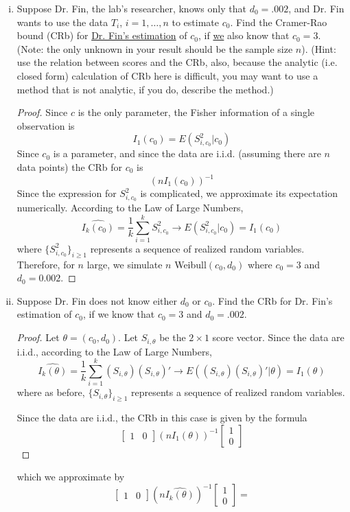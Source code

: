 \documentclass[letterpaper, 12pt]{article}
\begin{document}
\begin{enumerate}[(i)]
\item
Suppose Dr. Fin, the lab’s researcher, knows only that $d_0 = .002$, and Dr. Fin wants to use the data $T_i$,
$i = 1, \dots, n$ to estimate $c_0$. Find the Cramer-Rao bound (CRb) for \underline{Dr. Fin’s estimation} of $c_0$, if \underline{we} also
know that $c_0 = 3$. (Note: the only unknown in your result should be the sample size $n$). (Hint: use the
relation between scores and the CRb, also, because the analytic (i.e. closed form) calculation of CRb
here is difficult, you may want to use a method that is not analytic, if you do, describe the method.)

\begin{proof}
Since $c$ is the only parameter, the Fisher information of a single observation is
\[
I_1(c_0) = E(S_{i,c_0}^2 | c_0)
\]
Since $c_0$ is a parameter, and since the data are i.i.d. (assuming there are $n$ data points) the CRb for $c_0$ is
\[
(nI_1(c_0))^{-1}
\]
Since the expression for $S_{i,c_0}^2$ is complicated, we approximate its expectation numerically. According to the Law of Large Numbers, 
\[
\widehat{I_k(c_0)} = 
\frac{1}{k} \sum_{i=1}^k S_{i,c_0}^2 \to E(S_{i,c_0}^2 | c_0) = I_1(c_0)
\]
where $\{S_{i,c_0}^2\}_{i \geq 1}$ represents a sequence of realized random variables. Therefore, for $n$ large, we simulate $n$ Weibull$(c_0,d_0)$ where $c_0 = 3$ and $d_0 = 0.002$.
\end{proof}

\item
Suppose Dr. Fin does not know either $d_0$ or $c_0$. Find the CRb for Dr. Fin’s estimation of $c_0$, if we know
that $c_0 = 3$ and $d_0 = .002$.

\begin{proof}
Let $\theta = (c_0, d_0)$. Let $S_{i,\theta}$ be the $2 \times 1$ score vector. Since the data are i.i.d., according to the Law of Large Numbers,
\[
\widehat{I_k(\theta)} = \frac{1}{k}\sum_{i=1}^k (S_{i,\theta}) (S_{i, \theta})' \to E((S_{i,\theta}) (S_{i,\theta})'|\theta) = I_1(\theta)
\]
where as before, $\{S_{i,\theta}\}_{i \geq 1}$ represents a sequence of realized random variables.

Since the data are i.i.d., the CRb in this case is given by the formula
\[
\begin{bmatrix}
1 & 0
\end{bmatrix}
(nI_1(\theta))^{-1}
\begin{bmatrix}
1 \\ 0
\end{bmatrix}
\]
\end{proof}
which we approximate by
\[
\begin{bmatrix}
1 & 0
\end{bmatrix}
(n\widehat{I_k(\theta)})^{-1}
\begin{bmatrix}
1 \\ 0
\end{bmatrix}
=
\]


\end{enumerate}
\end{document}
